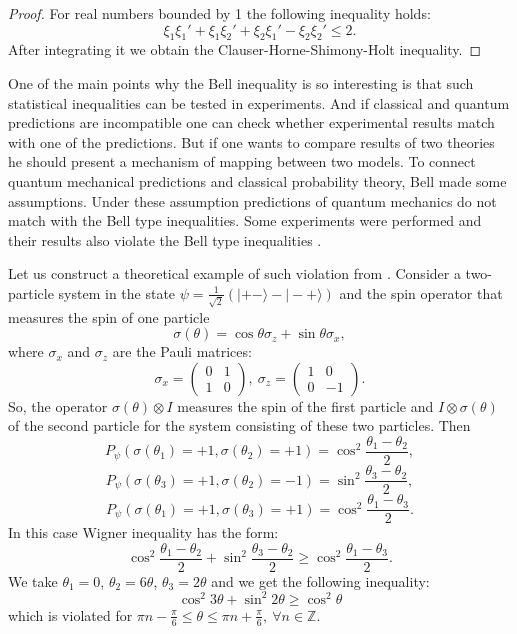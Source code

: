 \documentclass[%
master,         %
subf,           %
href,           %
colorlinks=true %
]{disser}
\numberwithin{equation}{section}
\numberwithin{figure}{section}
\begin{document}
\begin{proof}
For real numbers bounded by 1 the following inequality holds:
\[
\xi_1\xi_1' + \xi_1\xi_2' + \xi_2\xi_1' - \xi_2\xi_2' \leq 2.
\]
After integrating it we obtain the Clauser-Horne-Shimony-Holt inequality.

\end{proof}

One of the main points why the Bell inequality is so interesting is that such statistical inequalities can be tested in experiments. And if classical and quantum predictions are incompatible one can check whether experimental results match with one of the predictions. But if one wants to compare results of two theories he should present a mechanism of mapping between two models. To connect quantum mechanical predictions and classical probability theory, Bell made some assumptions. Under these assumption predictions of quantum mechanics do not match with the Bell type inequalities. Some experiments were performed and their results also violate the Bell type inequalities \cite{ASP1}.

Let us construct a theoretical example of such violation from \cite{Khrennikov_information}. Consider a two-particle system in the state $\psi = \frac{1}{\sqrt{2}}(|+-\rangle - |-+\rangle)$ and the spin operator that measures the spin of one particle
\[
\sigma(\theta) = \cos\theta\sigma_z + \sin\theta\sigma_x,
\] 
where $\sigma_x$ and $\sigma_z$ are the Pauli matrices:
\[
\sigma_x = 
\begin{pmatrix}
0 & 1\\
1 & 0
\end{pmatrix},\ \sigma_z = 
\begin{pmatrix}
1 & 0\\
0 & -1
\end{pmatrix}.
\]
So, the operator $\sigma(\theta) \otimes I$ measures the spin of the first particle and $I \otimes \sigma(\theta)$ of the second particle for the system consisting of these two particles.
Then
\[
P_\psi(\sigma(\theta_1) = + 1, \sigma(\theta_2) = +1) = \cos^2\frac{\theta_1 - \theta_2}{2},
\]
\[
P_\psi(\sigma(\theta_3) = + 1, \sigma(\theta_2) = -1) = \sin^2\frac{\theta_3 - \theta_2}{2},
\]
\[
P_\psi(\sigma(\theta_1) = + 1, \sigma(\theta_3) = +1) = \cos^2\frac{\theta_1 - \theta_3}{2}.
\]
In this case Wigner inequality has the form:
\[
\cos^2\frac{\theta_1 - \theta_2}{2} + \sin^2\frac{\theta_3 - \theta_2}{2} \geq  \cos^2\frac{\theta_1 - \theta_3}{2}.
\]
We take $\theta_1 = 0$, $\theta_2 = 6\theta$, $\theta_3 = 2\theta$ and we get the following inequality:
\[
\cos^2 3\theta + \sin^2 2\theta \geq \cos^2 \theta
\]
which is violated for $\pi n - \frac\pi 6 \leq \theta \leq \pi n + \frac\pi 6,\ \forall n \in \mathbb{Z}$.
\end{document}
